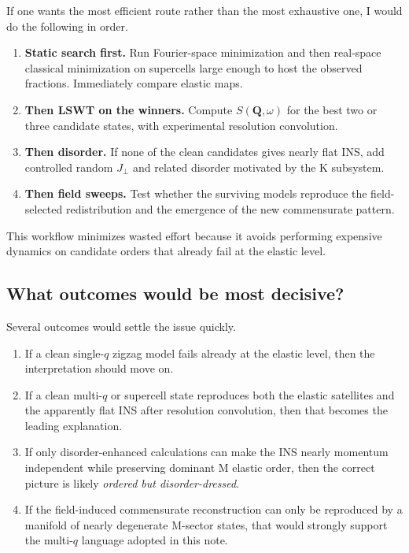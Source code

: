 \documentclass[11pt]{article}
\begin{document}
If one wants the most efficient route rather than the most exhaustive one, I would do the following in order.

\begin{enumerate}[leftmargin=2em,itemsep=0.35em]
    \item \textbf{Static search first.} Run Fourier-space minimization and then real-space classical minimization on supercells large enough to host the observed fractions. Immediately compare elastic maps.
    \item \textbf{Then LSWT on the winners.} Compute $S(\mathbf{Q},\omega)$ for the best two or three candidate states, with experimental resolution convolution.
    \item \textbf{Then disorder.} If none of the clean candidates gives nearly flat INS, add controlled random $J_\perp$ and related disorder motivated by the K subsystem.
    \item \textbf{Then field sweeps.} Test whether the surviving models reproduce the field-selected redistribution and the emergence of the new commensurate pattern.
\end{enumerate}

This workflow minimizes wasted effort because it avoids performing expensive dynamics on candidate orders that already fail at the elastic level.

\subsection{What outcomes would be most decisive?}

Several outcomes would settle the issue quickly.

\begin{enumerate}[leftmargin=2em,itemsep=0.35em]
    \item If a clean single-$q$ zigzag model fails already at the elastic level, then the interpretation should move on.
    \item If a clean multi-$q$ or supercell state reproduces both the elastic satellites and the apparently flat INS after resolution convolution, then that becomes the leading explanation.
    \item If only disorder-enhanced calculations can make the INS nearly momentum independent while preserving dominant M elastic order, then the correct picture is likely \emph{ordered but disorder-dressed}.
    \item If the field-induced commensurate reconstruction can only be reproduced by a manifold of nearly degenerate M-sector states, that would strongly support the multi-$q$ language adopted in this note.
\end{enumerate}
\end{document}

